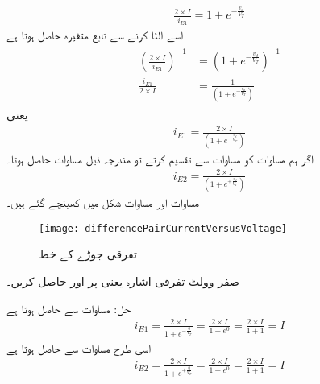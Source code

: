 \begin{align}
\frac{2 \times I}{i_{E1}}=1+e^{-\frac{v_d}{V_T}}
\end{align}
اسے الٹا کرنے سے تابع متغیرہ   حاصل ہوتا ہے
\begin{gather}
\begin{aligned}
\left( \frac{2 \times I}{i_{E1}}\right )^{-1}&=\left(1+e^{-\frac{v_d}{V_T}} \right )^{-1}\\
\frac{i_{E1}}{2 \times I}&=\frac{1}{\left(1+e^{-\frac{v_d}{V_T}} \right )}
\end{aligned}
\end{gather}
یعنی
\begin{align} \label{مساوات_تفرقی_پہلی_رو_بالمقابل_تفرقی_دباو}
i_{E1}=\frac{2 \times I}{\left(1+e^{-\frac{v_d}{V_T}} \right )}
\end{align}
اگر ہم مساوات   کو مساوات   سے تقسیم کرتے تو مندرجہ ذیل مساوات حاصل ہوتا۔
\begin{align} \label{مساوات_تفرقی_دوسری_رو_بالمقابل_تفرقی_دباو}
i_{E2}=\frac{2 \times I}{\left(1+e^{+\frac{v_d}{V_T}} \right )}
\end{align}
مساوات   اور مساوات  شکل   میں کھینچے گئے ہیں۔
\begin{figure}
\centering
\texttt{[image: differencePairCurrentVersusVoltage]}
\caption{تفرقی جوڑے کے  خط}
\label{شکل_تفرقی_جوڑے_کے_رو_بالمقابل_دباو_کے_خط}
\end{figure}
 
صفر وولٹ تفرقی اشارہ یعنی  پر  اور  حاصل کریں۔

حل:	مساوات   سے حاصل ہوتا ہے
\begin{align*}
i_{E1}=\frac{2 \times I}{1+e^{-\frac{0}{V_T}}}=\frac{2 \times I}{1+e^{0}}=\frac{2 \times I}{1+1}=I
\end{align*}
اسی طرح مساوات   سے حاصل ہوتا ہے
\begin{align*}
i_{E2}=\frac{2 \times I}{1+e^{+\frac{0}{V_T}}}=\frac{2 \times I}{1+e^{0}}=\frac{2 \times I}{1+1}=I
\end{align*}

